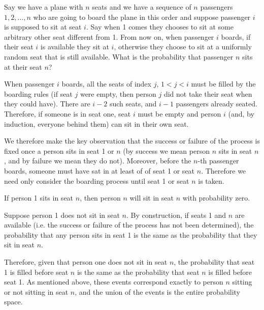 \documentclass[10pt]{article}
\begin{document}
\begin{problem}
    Say we have a plane with \( n  \) seats and we have a sequence of \( n \) passengers \( 1, 2, \ldots , n \) who
    are going to board the plane in this order and suppose passenger \( i \) is supposed to sit at seat \( i \). Say when
    1 comes they chooses to sit at some arbitrary other seat different from 1. From now on, when passenger \( i \)
    boards, if their seat \( i  \) is available they sit at \( i \), otherwise they choose to sit at a uniformly random seat that is
    still available. What is the probability that passenger \( n \) sits at their seat \( n \)?
\end{problem}

\begin{solution}[Solution]

    When passenger \( i \) boards, all the seats of index \( j \), \( 1<j<i \) must be filled by the boarding rules (if seat \( j \) were empty, then person \( j \) did not take their seat when they could have). There are \( i-2 \) such seats, and \( i-1 \) passengers already seated. Therefore, if someone is in seat one, seat \( i \) must be empty and person \( i \) (and, by induction, everyone behind them) can sit in their own seat.

    We therefore make the key observation that the success or failure of the process is fixed once a person sits in seat 1 or \( n \) (by success we mean person \( n \) sits in seat \( n \), and by failure we mean they do not). Moreover, before the \( n \)-th passenger boards, someone must have sat in at least of of seat 1 or seat \( n \). Therefore we need only consider the boarding process until seat 1 or seat \( n \) is taken.
    
    If person 1 sits in seat \( n \), then person \( n \) will sit in seat \( n \) with probability zero.

    Suppose person 1 does not sit in seat \( n \). By construction, if seats 1 and \( n \) are available (i.e. the success or failure of the process has not been determined), the probability that any person sits in seat 1 is the same as the probability that they sit in seat \( n \). 
    
    Therefore, given that person one does not sit in seat \( n \), the probability that seat 1 is filled before seat \( n \) is the same as the probability that seat \( n \) is filled before seat 1. As mentioned above, these events correspond exactly to person \( n \) sitting or not sitting in seat \( n \), and the union of the events is the entire probability space. 


\end{solution}
\end{document}
